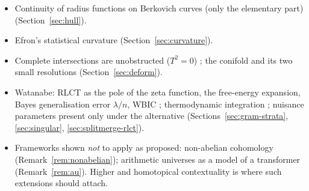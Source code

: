 \documentclass[11pt]{article}
\theoremstyle{definition}
\theoremstyle{remark}
\begin{document}
\begin{itemize}[itemsep=0pt]
  \item Continuity of radius functions on Berkovich curves (only the elementary part) \cite{pulita} (Section~\ref{sec:hull}).
  \item Efron's statistical curvature \cite{efron75} (Section~\ref{sec:curvature}).
  \item Complete intersections are unobstructed ($T^2=0$) \cite{hartshorne10}; the conifold and its two small resolutions \cite{atiyah58} (Section~\ref{sec:deform}).
  \item Watanabe: RLCT as the pole of the zeta function, the free-energy expansion, Bayes generalisation error $\lambda/n$, WBIC \cite{watanabe,watanabe18,wbic}; thermodynamic integration \cite{gelmanmeng}; nuisance parameters present only under the alternative \cite{davies87} (Sections~\ref{sec:gram-strata}, \ref{sec:singular}, \ref{sec:splitmerge-rlct}).
  \item Frameworks shown \emph{not} to apply as proposed: non-abelian cohomology \cite{giraud,breen} (Remark~\ref{rem:nonabelian}); arithmetic universes as a model of a transformer \cite{joyal73,maietti10} (Remark~\ref{rem:au}). Higher and homotopical contextuality \cite{orbr17,kharoofokay} is where such extensions should attach.
\end{itemize}
\end{document}

